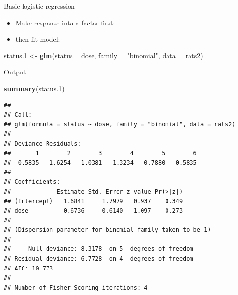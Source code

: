\documentclass[ignorenonframetext,]{beamer}
\newenvironment{Shaded}{\begin{snugshade}}{\end{snugshade}}
\newcommand{\DataTypeTok}[1]{\textcolor[rgb]{0.13,0.29,0.53}{#1}}
\newcommand{\FloatTok}[1]{\textcolor[rgb]{0.00,0.00,0.81}{#1}}
\newcommand{\KeywordTok}[1]{\textcolor[rgb]{0.13,0.29,0.53}{\textbf{#1}}}
\newcommand{\NormalTok}[1]{#1}
\newcommand{\OperatorTok}[1]{\textcolor[rgb]{0.81,0.36,0.00}{\textbf{#1}}}
\newcommand{\StringTok}[1]{\textcolor[rgb]{0.31,0.60,0.02}{#1}}
\providecommand{\tightlist}{%
  \setlength{\itemsep}{0pt}\setlength{\parskip}{0pt}}
\begin{document}
\begin{frame}[fragile]{Basic logistic regression}
\protect\hypertarget{basic-logistic-regression}{}

\begin{itemize}
\tightlist
\item
  Make response into a factor first:
\end{itemize}

\small

\begin{Shaded}
\end{Shaded}

\normalsize

\begin{itemize}
\tightlist
\item
  then fit model:
\end{itemize}

\small

\begin{Shaded}
\begin{Highlighting}[]
\NormalTok{status}\FloatTok{.1}\NormalTok{ <-}\StringTok{ }\KeywordTok{glm}\NormalTok{(status }\OperatorTok{~}\StringTok{ }\NormalTok{dose, }\DataTypeTok{family =} \StringTok{"binomial"}\NormalTok{, }\DataTypeTok{data =}\NormalTok{ rats2)}
\end{Highlighting}
\end{Shaded}

\normalsize

\end{frame}

\begin{frame}[fragile]{Output}
\protect\hypertarget{output-1}{}

\scriptsize

\begin{Shaded}
\begin{Highlighting}[]
\KeywordTok{summary}\NormalTok{(status}\FloatTok{.1}\NormalTok{)}
\end{Highlighting}
\end{Shaded}

\begin{verbatim}
## 
## Call:
## glm(formula = status ~ dose, family = "binomial", data = rats2)
## 
## Deviance Residuals: 
##       1        2        3        4        5        6  
##  0.5835  -1.6254   1.0381   1.3234  -0.7880  -0.5835  
## 
## Coefficients:
##             Estimate Std. Error z value Pr(>|z|)
## (Intercept)   1.6841     1.7979   0.937    0.349
## dose         -0.6736     0.6140  -1.097    0.273
## 
## (Dispersion parameter for binomial family taken to be 1)
## 
##     Null deviance: 8.3178  on 5  degrees of freedom
## Residual deviance: 6.7728  on 4  degrees of freedom
## AIC: 10.773
## 
## Number of Fisher Scoring iterations: 4
\end{verbatim}

\normalsize

\end{frame}
\end{document}
